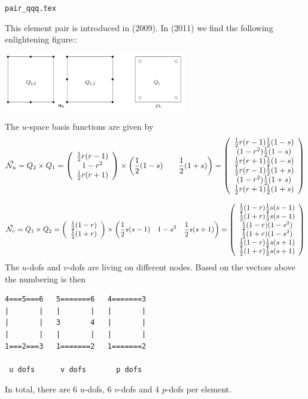 \begin{flushright} {\tiny {\color{gray} \tt pair\_qqq.tex}} \end{flushright}

This element pair is introduced in \textcite{zhan09} (2009).
In \textcite{huzh11} (2011) we find the following enlightening figure::
\begin{center}
\includegraphics[width=8cm]{images/pair_qqq/huzh11}
\end{center}

The $u$-space basis functions are given by 
\[
\vec{{\mathcal{N}}}_u = Q_2 \times Q_1 =
\left(
\begin{array}{c}
\frac12 r(r-1) \\
1-r^2 \\
\frac12 r(r+1)
\end{array}
\right)
\times
\left(
\frac12 (1-s) \qquad \frac12(1+s)
\right)
=
\left(
\begin{array}{c}
\frac12 r(r-1)  \frac12(1-s)\\ 
(1-r^2)         \frac12(1-s)\\
\frac12 r(r+1)  \frac12(1-s)\\
\frac12 r(r-1)  \frac12(1+s)\\
(1-r^2)         \frac12(1+s)\\
\frac12 r(r+1)  \frac12(1+s)
\end{array}
\right)
\]

\[
\vec{{\mathcal{N}}}_v = Q_1 \times Q_2 = 
\left(
\begin{array}{c}
\frac12 (1-r) \\
\frac12(1+r)
\end{array}
\right)
\times
\left(
\frac12 s(s-1)  \quad
1-s^2 \quad
\frac12 s(s+1)
\right)
=
\left(
\begin{array}{c}
\frac12 (1-r) \frac12 s(s-1) \\
\frac12(1+r)  \frac12 s(s-1) \\
\frac12 (1-r) (1-s^2) \\
\frac12(1+r)  (1-s^2) \\
\frac12 (1-r) \frac12 s(s+1)\\
\frac12(1+r)  \frac12 s(s+1)
\end{array}
\right)
\]
The $u$-dofs and $v$-dofs are living on different nodes.
Based on the vectors above the numbering is then 
\begin{verbatim}
4===5===6   5=======6   4=======3
|       |   |       |   |       |
|       |   3       4   |       |
|       |   |       |   |       |
1===2===3   1=======2   1=======2

 u dofs      v dofs       p dofs

\end{verbatim}
In total, there are 6 $u$-dofs, 6 $v$-dofs and 4 $p$-dofs per element.

